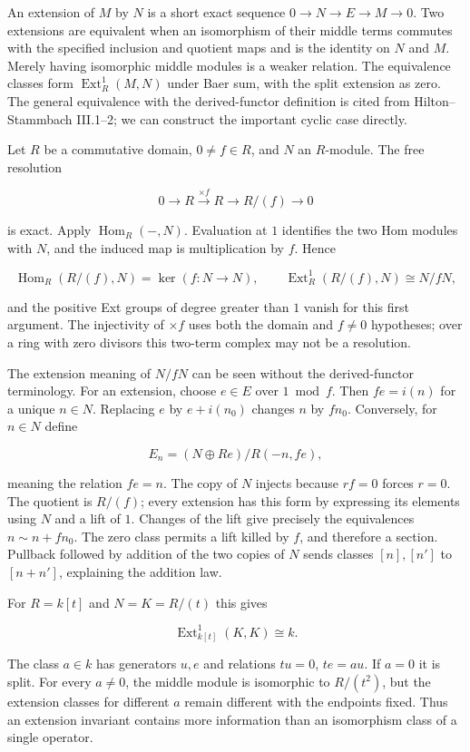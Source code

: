 \documentclass[
  11pt,
]{article}
\begin{document}
An extension of \(M\) by \(N\) is a short exact sequence
\(0\to N\to E\to M\to0\). Two extensions are equivalent when an
isomorphism of their middle terms commutes with the specified inclusion
and quotient maps and is the identity on \(N\) and \(M\). Merely having
isomorphic middle modules is a weaker relation. The equivalence classes
form \(\operatorname{Ext}^1_R(M,N)\) under Baer sum, with the split
extension as zero. The general equivalence with the derived-functor
definition is cited from Hilton--Stammbach III.1--2; we can construct
the important cyclic case directly.

Let \(R\) be a commutative domain, \(0\ne f\in R\), and \(N\) an
\(R\)-module. The free resolution

\[0\longrightarrow R\xrightarrow{\times f}R
\longrightarrow R/(f)\longrightarrow0\]

is exact. Apply \(\operatorname{Hom}_R(-,N)\). Evaluation at \(1\)
identifies the two Hom modules with \(N\), and the induced map is
multiplication by \(f\). Hence

\[\operatorname{Hom}_R(R/(f),N)=\ker(f:N\to N),
\qquad\operatorname{Ext}^1_R(R/(f),N)\cong N/fN,\]

and the positive Ext groups of degree greater than \(1\) vanish for this
first argument. The injectivity of \(\times f\) uses both the domain and
\(f\ne0\) hypotheses; over a ring with zero divisors this two-term
complex may not be a resolution.

The extension meaning of \(N/fN\) can be seen without the
derived-functor terminology. For an extension, choose \(e\in E\) over
\(1\bmod f\). Then \(fe=i(n)\) for a unique \(n\in N\). Replacing \(e\)
by \(e+i(n_0)\) changes \(n\) by \(fn_0\). Conversely, for \(n\in N\)
define

\[E_n=(N\oplus Re)/R(-n,fe),\]

meaning the relation \(fe=n\). The copy of \(N\) injects because
\(rf=0\) forces \(r=0\). The quotient is \(R/(f)\); every extension has
this form by expressing its elements using \(N\) and a lift of \(1\).
Changes of the lift give precisely the equivalences \(n\sim n+fn_0\).
The zero class permits a lift killed by \(f\), and therefore a section.
Pullback followed by addition of the two copies of \(N\) sends classes
\([n],[n']\) to \([n+n']\), explaining the addition law.

For \(R=k[t]\) and \(N=K=R/(t)\) this gives

\[\operatorname{Ext}^1_{k[t]}(K,K)\cong k.\]

The class \(a\in k\) has generators \(u,e\) and relations \(tu=0\),
\(te=au\). If \(a=0\) it is split. For every \(a\ne0\), the middle
module is isomorphic to \(R/(t^2)\), but the extension classes for
different \(a\) remain different with the endpoints fixed. Thus an
extension invariant contains more information than an isomorphism class
of a single operator.
\end{document}
